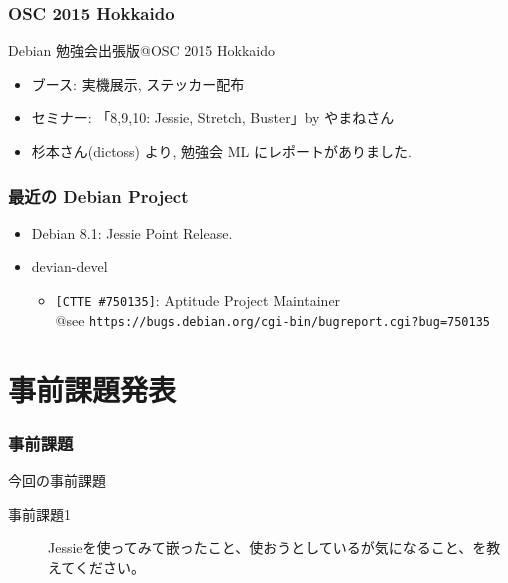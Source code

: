 \documentclass[cjk,dvipdfmx,10pt,compress,%
hyperref={bookmarks=true,bookmarksnumbered=true,bookmarksopen=false,%
  colorlinks=false,%
  pdftitle={第 99 回 関西 Debian 勉強会},%
  pdfauthor={倉敷・のがた・佐々木・かわだ},%
  pdfsubject={資料},%
}]{beamer}
\begin{document}
\begin{frame}[fragile]
  \frametitle{OSC 2015 Hokkaido}
      \begin{block}{Debian 勉強会出張版@OSC 2015 Hokkaido}
        \begin{itemize}
        \item%
          ブース: 実機展示, ステッカー配布
        \item %
          セミナー: 「8,9,10: Jessie, Stretch, Buster」by やまねさん
        \item %
          杉本さん(dictoss) より, 勉強会 ML にレポートがありました.
        \end{itemize}
      \end{block}
\end{frame}


\begin{frame}[fragile]
  \frametitle{最近の Debian Project}
  \begin{itemize}
  \item %
    Debian 8.1: Jessie Point Release.
  \item devian-devel %
    \begin{itemize}
    \item%
      \texttt{[CTTE \#750135]}: Aptitude Project Maintainer \\
      @see \texttt{https://bugs.debian.org/cgi-bin/bugreport.cgi?bug=750135}
    \end{itemize}
  \end{itemize}
\end{frame}


\section{事前課題発表}


\begin{frame}[fragile]
  \frametitle{事前課題}
  \begin{block}{今回の事前課題}
    \begin{description}
    \item[事前課題1]
      Jessieを使ってみて嵌ったこと、使おうとしているが気になること、を教えてください。
    \end{description}
  \end{block}
\end{frame}
\end{document}
